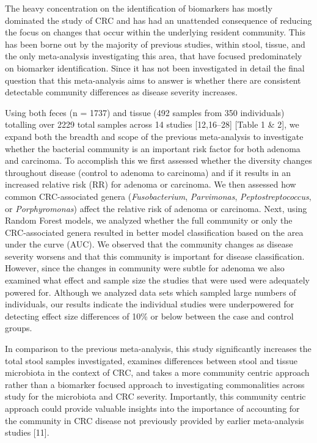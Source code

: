\documentclass[12pt,]{article}
\begin{document}
The heavy concentration on the identification of biomarkers has mostly
dominated the study of CRC and has had an unattended consequence of
reducing the focus on changes that occur within the underlying resident
community. This has been borne out by the majority of previous studies,
within stool, tissue, and the only meta-analysis investigating this
area, that have focused predominately on biomarker identification. Since
it has not been investigated in detail the final question that this
meta-analysis aims to answer is whether there are consistent detectable
community differences as disease severity increases.

Using both feces (n = 1737) and tissue (492 samples from 350
individuals) totalling over 2229 total samples across 14 studies
{[}12,16--28{]} {[}Table 1 \& 2{]}, we expand both the breadth and scope
of the previous meta-analysis to investigate whether the bacterial
community is an important risk factor for both adenoma and carcinoma. To
accomplish this we first assessed whether the diversity changes
throughout disease (control to adenoma to carcinoma) and if it results
in an increased relative risk (RR) for adenoma or carcinoma. We then
assessed how common CRC-associated genera (\emph{Fusobacterium},
\emph{Parvimonas}, \emph{Peptostreptococcus}, or \emph{Porphyromonas})
affect the relative risk of adenoma or carcinoma. Next, using Random
Forest models, we analyzed whether the full community or only the
CRC-associated genera resulted in better model classification based on
the area under the curve (AUC). We observed that the community changes
as disease severity worsens and that this community is important for
disease classification. However, since the changes in community were
subtle for adenoma we also examined what effect and sample size the
studies that were used were adequately powered for. Although we analyzed
data sets which sampled large numbers of individuals, our results
indicate the individual studies were underpowered for detecting effect
size differences of 10\% or below between the case and control groups.

In comparison to the previous meta-analysis, this study significantly
increases the total stool samples investigated, examines differences
between stool and tissue microbiota in the context of CRC, and takes a
more community centric approach rather than a biomarker focused approach
to investigating commonalities across study for the microbiota and CRC
severity. Importantly, this community centric approach could provide
valuable insights into the importance of accounting for the community in
CRC disease not previously provided by earlier meta-analysis studies
{[}11{]}.
\end{document}
